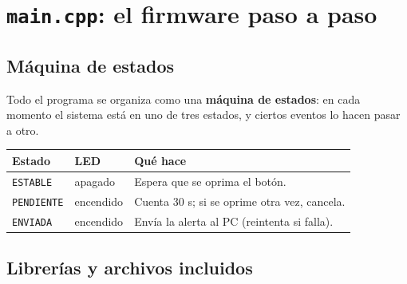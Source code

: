 \documentclass[11pt,a4paper]{article}
\begin{document}
\section{\texttt{main.cpp}: el firmware paso a paso}

\subsection{Máquina de estados}

Todo el programa se organiza como una \textbf{máquina de estados}: en cada momento
el sistema está en uno de tres estados, y ciertos eventos lo hacen pasar a otro.

\begin{center}
\end{center}

\begin{center}
\begin{tabular}{@{}lll@{}}
\toprule
\textbf{Estado} & \textbf{LED} & \textbf{Qué hace}\\
\midrule
\texttt{ESTABLE}   & apagado   & Espera que se oprima el botón.\\
\texttt{PENDIENTE} & encendido & Cuenta 30 s; si se oprime otra vez, cancela.\\
\texttt{ENVIADA}   & encendido & Envía la alerta al PC (reintenta si falla).\\
\bottomrule
\end{tabular}
\end{center}

\subsection{Librerías y archivos incluidos}
\end{document}
